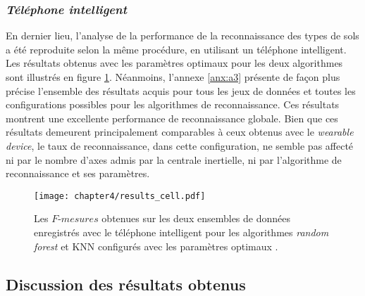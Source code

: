 \subsubsection{\textit{Téléphone intelligent}}

En dernier lieu, l'analyse de la performance de la reconnaissance des types de sols a été reproduite selon la même procédure, en utilisant un téléphone intelligent. Les résultats obtenus avec les paramètres optimaux pour les deux algorithmes sont illustrés en figure \ref{fig:results_cell}. Néanmoins, l'annexe \ref{anx:a3} présente de façon plus précise l'ensemble des résultats acquis pour tous les jeux de données et toutes les configurations possibles pour les algorithmes de reconnaissance. Ces résultats montrent une excellente performance de reconnaissance globale. Bien que ces résultats demeurent principalement comparables à ceux obtenus avec le \textit{wearable device}, le taux de reconnaissance, dans cette configuration, ne semble pas affecté ni par le nombre d'axes admis par la centrale inertielle, ni par l'algorithme de reconnaissance et ses paramètres.

\begin{figure}[H]
	\centering
	\texttt{[image: chapter4/results\_cell.pdf]}
        \caption[Les $F\mbox{-} mesures$ obtenues sur les deux ensembles de données enregistrés avec le téléphone intelligent pour les algorithmes \textit{random forest} et \acs{KNN} configurés avec les paramètres optimaux.]{Les $F\mbox{-} mesures$ obtenues sur les deux ensembles de données enregistrés avec le téléphone intelligent pour les algorithmes \textit{random forest} et \acs{KNN} configurés avec les paramètres optimaux \citep{Thullier2017}.}
	\label{fig:results_cell}
\end{figure}

\subsection{Discussion des résultats obtenus}


